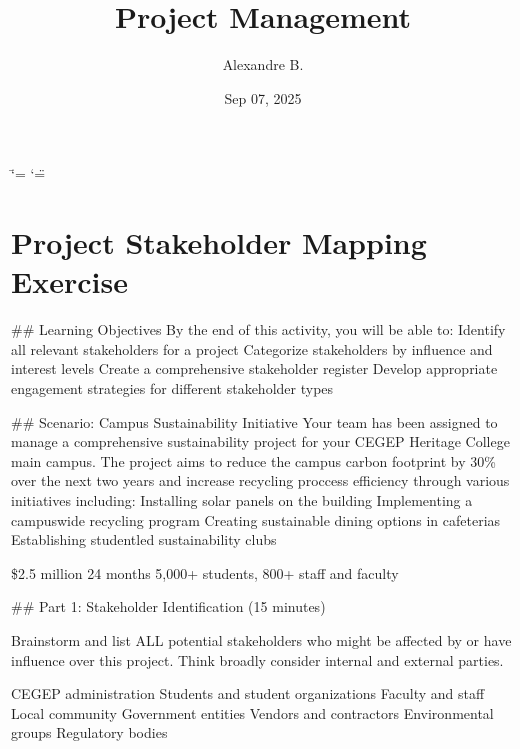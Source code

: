 \documentclass[letterpaper,10pt,english]{sphinxmanual}
\title{Project Management}
\date{Sep 07, 2025}
\author{Alexandre B.\@{}}
\begin{document}
\ifdefined\shorthandoff
  \ifnum\catcode`\=\string=\active\shorthandoff{=}\fi
  \ifnum\catcode`\"=\active{}\fi
\fi

\pagestyle{empty}
\sphinxmaketitle
\pagestyle{plain}
\sphinxtableofcontents
\pagestyle{normal}
\label{\detokenize{index::doc}}


\sphinxstepscope


\chapter{Project Stakeholder Mapping Exercise}
\label{\detokenize{mapping_stakeholder:project-stakeholder-mapping-exercise}}\label{\detokenize{mapping_stakeholder::doc}}
\sphinxAtStartPar
\#\# Learning Objectives
By the end of this activity, you will be able to:
\sphinxhyphen{} Identify all relevant stakeholders for a project
\sphinxhyphen{} Categorize stakeholders by influence and interest levels
\sphinxhyphen{} Create a comprehensive stakeholder register
\sphinxhyphen{} Develop appropriate engagement strategies for different stakeholder types

\sphinxAtStartPar
\#\# Scenario: Campus Sustainability Initiative
Your team has been assigned to manage a comprehensive sustainability project for your CEGEP Heritage College main campus. The project aims to reduce the campus carbon footprint by 30\% over the next two years and increase recycling proccess efficiency through various initiatives including:
\sphinxhyphen{} Installing solar panels on the building
\sphinxhyphen{} Implementing a campus\sphinxhyphen{}wide recycling program
\sphinxhyphen{} Creating sustainable dining options in cafeterias
\sphinxhyphen{} Establishing student\sphinxhyphen{}led sustainability clubs

\sphinxAtStartPar
{} \$2.5 million
 24 months
 5,000+ students, 800+ staff and faculty

\sphinxAtStartPar
\#\# Part 1: Stakeholder Identification (15 minutes)

\sphinxAtStartPar
{} Brainstorm and list ALL potential stakeholders who might be affected by or have influence over this project. Think broadly \sphinxhyphen{} consider internal and external parties.

\sphinxAtStartPar
{}
\sphinxhyphen{} CEGEP administration
\sphinxhyphen{} Students and student organizations
\sphinxhyphen{} Faculty and staff
\sphinxhyphen{} Local community
\sphinxhyphen{} Government entities
\sphinxhyphen{} Vendors and contractors
\sphinxhyphen{} Environmental groups
\sphinxhyphen{} Regulatory bodies
\end{document}
